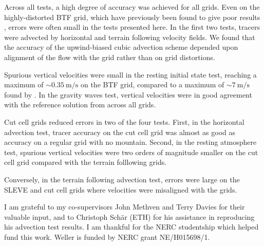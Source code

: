\documentclass[draft]{ametsoc}
\begin{document}
Across all tests, a high degree of accuracy was achieved for all grids.  Even on the highly-distorted BTF grid, which have previously been found to give poor results \citep{schaer2002,klemp2011,good2014}, errors were often small in the tests presented here.  In the first two tests, tracers were advected by horizontal and terrain following velocity fields.  We found that the accuracy of the upwind-biased cubic advection scheme depended upon alignment of the flow with the grid rather than on grid distortions.

Spurious vertical velocities were small in the resting initial state test, reaching a maximum of $\sim \SI{0.35}{\meter\per\second}$ on the BTF grid, compared to a maximum of $\sim \SI{7}{\meter\per\second}$ found by \citet{klemp2011}.  In the gravity waves test, vertical velocities were in good agreement with the reference solution from \citet{melvin2010} across all grids.

Cut cell grids reduced errors in two of the four tests.  First, in the horizontal advection test, tracer accuracy on the cut cell grid was almost as good as accuracy on a regular grid with no mountain.  Second, in the resting atmosphere test, spurious vertical velocities were two orders of magnitude smaller on the cut cell grid compared with the terrain folllowing grids.

Conversely, in the terrain following advection test, errors were large on the SLEVE and cut cell grids where velocities were misaligned with the grids.

\acknowledgments
I am grateful to my co-supervisors John Methven and Terry Davies for their valuable input, and to Christoph Sch\"{a}r (ETH) for his assistance in reproducing his advection test results.  I am thankful for the NERC studentship which helped fund this work.  Weller is funded by NERC grant NE/H015698/1.

\begin{appendices}

\end{appendices}





\end{document}
